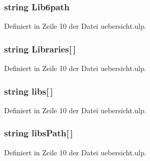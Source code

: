\hypertarget{uebersicht_8ulp_a97d250e022f542a08d669ed5973df53e}{}
\subsubsection[{Lib6path}]{\setlength{\rightskip}{0pt plus 5cm}string Lib6path}\label{uebersicht_8ulp_a97d250e022f542a08d669ed5973df53e}


Definiert in Zeile 10 der Datei uebersicht.\+ulp.

\hypertarget{uebersicht_8ulp_ac94a9aaf064a212f836473b5727f8113}{}
\subsubsection[{Libraries}]{\setlength{\rightskip}{0pt plus 5cm}string Libraries\mbox{[}$\,$\mbox{]}}\label{uebersicht_8ulp_ac94a9aaf064a212f836473b5727f8113}


Definiert in Zeile 10 der Datei uebersicht.\+ulp.

\hypertarget{uebersicht_8ulp_a82d5ba0c005e6ff309408fd1ce58c589}{}
\subsubsection[{libs}]{\setlength{\rightskip}{0pt plus 5cm}string libs\mbox{[}$\,$\mbox{]}}\label{uebersicht_8ulp_a82d5ba0c005e6ff309408fd1ce58c589}


Definiert in Zeile 10 der Datei uebersicht.\+ulp.

\hypertarget{uebersicht_8ulp_ab50ee1dbefcf5a146f47b47945acaf6b}{}
\subsubsection[{libs\+Path}]{\setlength{\rightskip}{0pt plus 5cm}string libs\+Path\mbox{[}$\,$\mbox{]}}\label{uebersicht_8ulp_ab50ee1dbefcf5a146f47b47945acaf6b}


Definiert in Zeile 10 der Datei uebersicht.\+ulp.

\hypertarget{uebersicht_8ulp_aa69b6cb226fe16181283ae71f98447ee}{}
